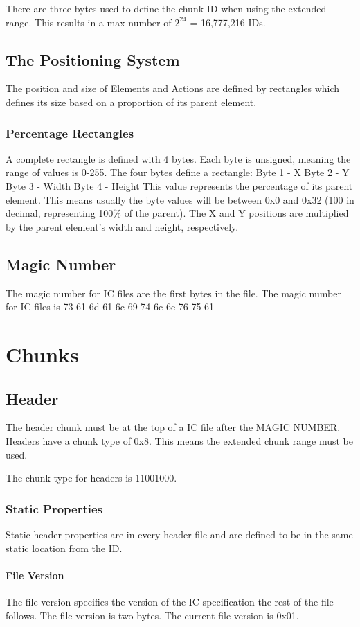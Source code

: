 \documentclass{report}
\begin{document}
There are three bytes used to define the chunk ID when using the extended range. This results in a max number of $2^{24}$ = 16,777,216 IDs.

\section{The Positioning System}
The position and size of Elements and Actions are defined by rectangles which defines its size based on a proportion of its parent element.
\subsection{Percentage Rectangles}
A complete rectangle is defined with 4 bytes. Each byte is unsigned, meaning the range of values is 0-255.
The four bytes define a rectangle:
Byte 1 - X
Byte 2 - Y
Byte 3 - Width
Byte 4 - Height
This value represents the percentage of its parent element. This means usually the byte values will be between 0x0 and 0x32 (100 in decimal, representing 100\% of the parent).
The X and Y positions are multiplied by the parent element's width and height, respectively.

\section{Magic Number}
The magic number for IC files are the first bytes in the file.
The magic number for IC files is 73 61 6d 61 6c 69 74 6c 6e 76 75 61


\chapter{Chunks}

\section{Header}
The header chunk must be at the top of a IC file after the MAGIC NUMBER. 
Headers have a chunk type of 0x8.
This means the extended chunk range must be used.

The chunk type for headers is 11001000. 

\subsection{Static Properties}
Static header properties are in every header file and are defined to be in the same static location from the ID. 

\subsubsection{File Version}
The file version specifies the version of the IC specification the rest of the file follows. The file version is two bytes.
The current file version is 0x01.
\end{document}
